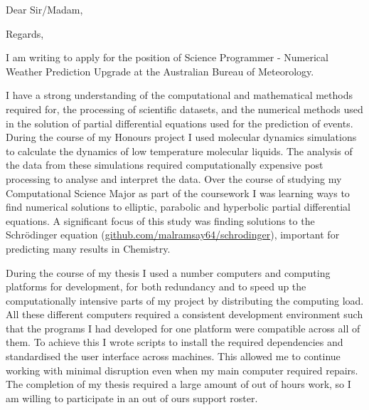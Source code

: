 


\recipient{~}{~}
\date{\today}
\opening{Dear Sir/Madam,}
\closing{Regards,}



\makelettertitle

I am writing to apply for the position of Science Programmer - Numerical Weather Prediction Upgrade at the Australian Bureau of Meteorology.


I have a strong understanding of the computational and mathematical methods required for, the processing of scientific datasets, and the numerical methods used in the solution of partial differential equations used for the prediction of events. During the course of my Honours project I used molecular dynamics simulations to calculate the dynamics of low temperature molecular liquids. The analysis of the data from these simulations required computationally expensive post processing to analyse and interpret the data. Over the course of studying my Computational Science Major as part of the coursework I was learning ways to find numerical solutions to elliptic, parabolic and hyperbolic partial differential equations. A significant focus of this study was finding solutions to the Schr\"odinger equation (\href{https://github.com/malramsay64/schrodinger}{github.com/malramsay64/schrodinger}), important for predicting many results in Chemistry.


During the course of my thesis I used a number computers and computing platforms for development, for both redundancy and to speed up the computationally intensive parts of my project by distributing the computing load. All these different computers required a consistent development environment such that the programs I had developed for one platform were compatible across all of them. To achieve this I wrote scripts to install the required dependencies and standardised the user interface across machines. This allowed me to continue working with minimal disruption even when my main computer required repairs. The completion of my thesis required a large amount of out of hours work, so I am willing to participate in an out of ours support roster.


